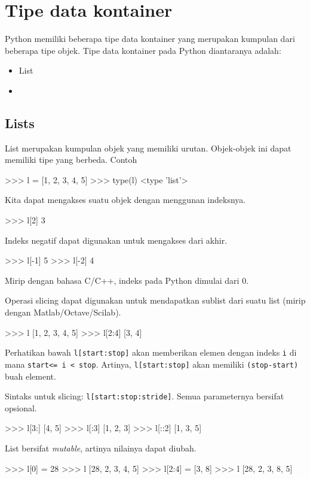 \section{Tipe data kontainer}
Python memiliki beberapa tipe data kontainer yang merupakan kumpulan
dari beberapa tipe objek. Tipe data kontainer pada Python diantaranya
adalah:
\begin{itemize}
\item List
\item 
\end{itemize}

\subsection{Lists}
List merupakan kumpulan objek yang memiliki urutan. Objek-objek ini
dapat memiliki tipe yang berbeda. Contoh
\begin{pyconcode}
>>> l = [1, 2, 3, 4, 5]
>>> type(l)
<type 'list'>
\end{pyconcode}

Kita dapat mengakses suatu objek dengan menggunan indeksnya.
\begin{pyconcode}
>>> l[2]
3
\end{pyconcode}

Indeks negatif dapat digunakan untuk mengakses dari akhir.
\begin{pyconcode}
>>> l[-1]
5
>>> l[-2]
4
\end{pyconcode}

Mirip dengan bahasa C/C++, indeks pada Python dimulai dari 0.

Operasi slicing dapat digunakan untuk mendapatkan sublist dari
suatu list (mirip dengan Matlab/Octave/Scilab).
\begin{pyconcode}
>>> l
[1, 2, 3, 4, 5]
>>> l[2:4]
[3, 4]
\end{pyconcode}

Perhatikan bawah \texttt{l[start:stop]} akan memberikan
elemen dengan indeks \texttt{i} di mana \texttt{start<= i < stop}.
Artinya, \texttt{l[start:stop]} akan memiliki
\texttt{(stop-start)} buah element.

Sintaks untuk slicing: \texttt{l[start:stop:stride]}.
Semua parameternya bersifat opsional.
\begin{pyconcode}
>>> l[3:]
[4, 5]
>>> l[:3]
[1, 2, 3]
>>> l[::2]
[1, 3, 5]
\end{pyconcode}

List bersifat \textit{mutable}, artinya nilainya dapat diubah.
\begin{pyconcode}
>>> l[0] = 28
>>> l
[28, 2, 3, 4, 5]
>>> l[2:4] = [3, 8] 
>>> l
[28, 2, 3, 8, 5]
\end{pyconcode}

